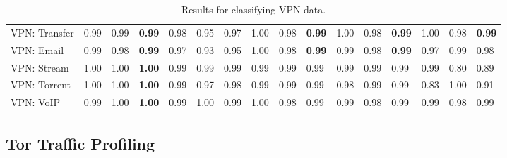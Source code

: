 \begin{table} [ht!]
\begin{tabular} {|p{2cm}|p{0.5cm}p{0.5cm}p{0.5cm}|p{0.5cm}p{0.5cm}p{0.5cm}|p{0.5cm}p{0.5cm}p{0.5cm}|p{0.5cm}p{0.5cm}p{0.5cm}|p{0.5cm}p{0.5cm}p{0.5cm}|}
VPN: Transfer & 0.99 & 0.99 & \textbf{0.99} & 0.98 & 0.95 & 0.97 & 1.00 & 0.98 & \textbf{0.99} & 1.00 & 0.98 & \textbf{0.99} & 1.00 & 0.98 & \textbf{0.99} \\
VPN: Email & 0.99 & 0.98 & \textbf{0.99} & 0.97 & 0.93 & 0.95 & 1.00 & 0.98 & \textbf{0.99} & 0.99 & 0.98 & \textbf{0.99} & 0.97 & 0.99 & 0.98 \\
VPN: Stream & 1.00 & 1.00 & \textbf{1.00} & 0.99 & 0.99 & 0.99 & 0.99 & 0.99 & 0.99 & 0.99 & 0.99 & 0.99 & 0.99 & 0.80 & 0.89 \\
VPN: Torrent & 1.00 & 1.00 & \textbf{1.00} & 0.99 & 0.97 & 0.98 & 0.99 & 0.99 & 0.99 & 0.98 & 0.99 & 0.99 & 0.83 & 1.00 & 0.91 \\
VPN: VoIP & 0.99 & 1.00 & \textbf{1.00} & 0.99 & 1.00 & 0.99 & 1.00 & 0.98 & 0.99 & 0.99 & 0.98 & 0.99 & 0.99 & 0.98 & 0.99 \\
\hline
\end{tabular}
\label{tab:vpnresults}
\caption{Results for classifying VPN data.}
\end{table}

\subsection{Tor Traffic Profiling}

